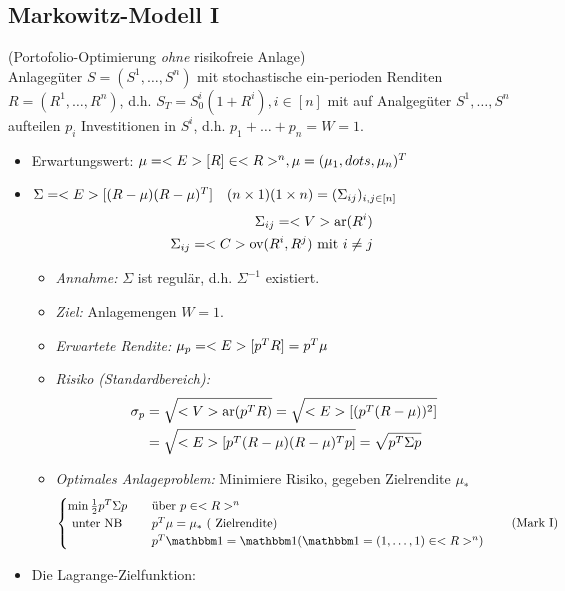\subsection*{Markowitz-Modell I}
(Portofolio-Optimierung \emph{ohne} risikofreie Anlage)\\
Anlagegüter $S = (S^1, \dots, S^n)$ mit stochastische ein-perioden Renditen $R = (R^1, \dots, R^n)$, d.h. $S_T = S_0^i(1+R^i), i \in [n]$ mit auf Analgegüter $S^1, \dots, S^n$ aufteilen $p_i$ Investitionen in $S^i$, d.h. $p_1 + \dots + p_n = W = 1$.
\begin{itemize}
	\item Erwartungswert: $\mu = <E>[R] \in <R>^n, \mu = (\mu_1, dots, \mu_n)^T$
	\item $\Sigma = <E>[(R-\mu)(R-\mu)^T]\quad (n\times 1)(1\times n) = (\Sigma_{ij})_{i,j \in [n]}$
	\begin{align*}
		\Sigma_{ij} = <V>\text{ar}(R^i)\\
		\Sigma_{ij} = <C>\text{ov}(R^{i},R^j) \text{ mit } i \neq j
	\end{align*}
	\begin{itemize}
		\item \emph{Annahme:} $\Sigma$ ist regulär, d.h. $\Sigma^{-1}$ existiert.
		\item \emph{Ziel:} Anlagemengen $W=1$. 
		\item \emph{Erwartete Rendite:} $\mu_p = <E>[p^T R] = p^T \mu$
		\item \emph{Risiko (Standardbereich):}
		\begin{align*}
			\sigma_p &= \sqrt{<V>\text{ar}(p^T R)} = \sqrt{<E>[(p^T (R-\mu))^2]}\\
			&=\sqrt{<E>[p^T (R-\mu)(R-\mu)^Tp]} = \sqrt{p^T \Sigma p}
		\end{align*}
		\item \emph{Optimales Anlageproblem:} Minimiere Risiko, gegeben Zielrendite $\mu_{\ast}$
		\begin{align}
			\begin{cases}
				\min \half p^T \Sigma p & \quad\text{über } p \in \R^n\\
				\text{ unter NB} &\quad p^T \mu = \mu_{\ast} \text{ ( Zielrendite)}\\
				&\quad p^T \indi = \indi (\indi = (1, \dots, 1) \in \R^n)
			\end{cases} \label{eq_Markow_one}\tag{Mark I}
		\end{align}
	\end{itemize}
	\item Die Lagrange-Zielfunktion: 
\begin{align*}

\end{align*}
\end{itemize}
